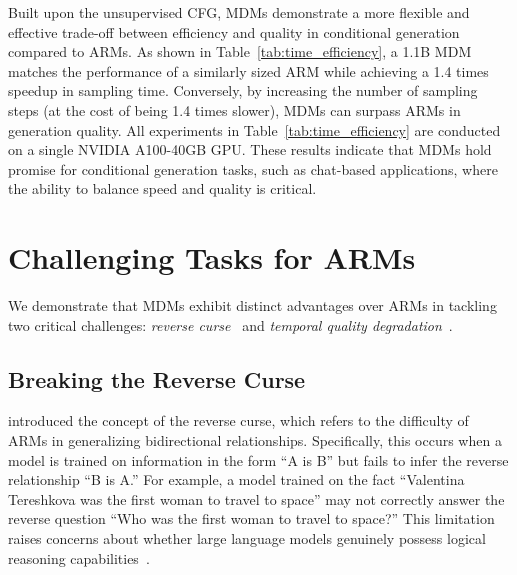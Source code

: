 \documentclass{article} %
\begin{document}
Built upon the unsupervised CFG, MDMs demonstrate a more flexible and effective trade-off between efficiency and quality in conditional generation compared to ARMs. As shown in Table~\ref{tab:time_efficiency}, a 1.1B MDM matches the performance of a similarly sized ARM while achieving a 1.4 times speedup in sampling time. Conversely, by increasing the number of sampling steps (at the cost of being 1.4 times slower), MDMs can surpass ARMs in generation quality. All experiments in Table~\ref{tab:time_efficiency} are conducted on a single NVIDIA A100-40GB GPU. These results indicate that MDMs hold promise for conditional generation tasks, such as chat-based applications, where the ability to balance speed and quality is critical.







\section{Challenging Tasks for ARMs}
\label{sec:generalization}

We demonstrate that MDMs exhibit distinct advantages over ARMs in tackling two critical challenges: \emph{reverse curse}~\citep{berglund2023reversal} and \emph{temporal quality degradation}~\citep{vela2022temporal}.

\subsection{Breaking the Reverse Curse}
\label{sec:break_reverse}

\cite{berglund2023reversal} introduced the concept of the reverse curse, which refers to the difficulty of ARMs in generalizing bidirectional relationships. Specifically, this occurs when a model is trained on information in the form “A is B” but fails to infer the reverse relationship “B is A.” For example, a model trained on the fact “Valentina Tereshkova was the first woman to travel to space” may not correctly answer the reverse question “Who was the first woman to travel to space?” This limitation raises concerns about whether large language models genuinely possess logical reasoning capabilities~\citep{berglund2023reversal}.
\end{document}
